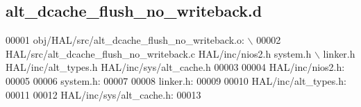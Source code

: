 \subsection{alt\+\_\+dcache\+\_\+flush\+\_\+no\+\_\+writeback.\+d}
\label{alt__dcache__flush__no__writeback_8d_source}

\begin{DoxyCode}
00001 obj/HAL/src/alt_dcache_flush_no_writeback.o: \(\backslash\)
00002  HAL/src/alt_dcache_flush_no_writeback.c HAL/inc/nios2.h system.h \(\backslash\)
 linker.h HAL/inc/alt\_types.h HAL/inc/sys/alt\_cache.h
00003 
00004 HAL/inc/nios2.h:
00005 
00006 system.h:
00007 
00008 linker.h:
00009 
00010 HAL/inc/alt\_types.h:
00011 
00012 HAL/inc/sys/alt\_cache.h:
00013 \end{DoxyCode}
